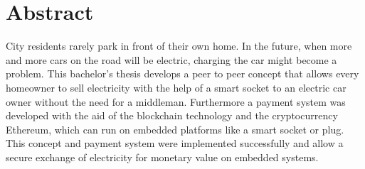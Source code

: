 \thispagestyle{empty}

\section*{Abstract}

City residents rarely park in front of their own home.
In the future, when more and more cars on the road will be electric, charging the car might become a problem.
This bachelor’s thesis develops a peer to peer concept that allows every homeowner to sell electricity with the help of a smart socket to an electric car owner without the need for a middleman.
Furthermore a payment system was developed with the aid of the blockchain technology and the cryptocurrency Ethereum, which can run on embedded platforms like a smart socket or plug.
This concept and payment system were implemented successfully and allow a secure exchange of electricity for monetary value on embedded systems.